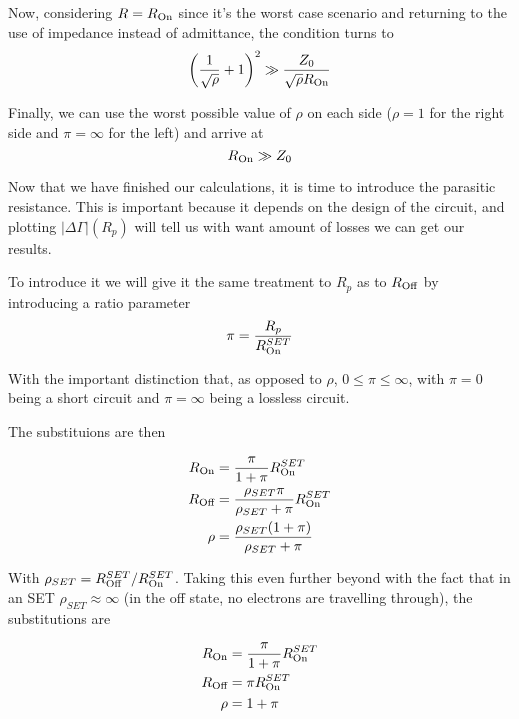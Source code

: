 \documentclass[../main.tex]{subfiles}
\begin{document}
Now, considering \(R = R_{\text{On}}\) since it's the worst case scenario and
returning to the use of impedance instead of admittance, the condition turns to
\begin{equation*}
\label{eq:ProtoOptParallelContrApprox}
    \left(\frac{1}{\sqrt\rho} + 1\right)^2 \gg
    \frac{Z_{0}}{\sqrt\rho R_{\text{On}}}
\end{equation*}

Finally, we can use the worst possible value of \(\rho\) on each side
(\(\rho = 1\) for the right side and \(\pi = \infty\) for the left) and
arrive at
\begin{equation}
\label{eq:OptParallelContrApprox}
    R_{\text{On}} \gg Z_{0}
\end{equation}

Now that we have finished our calculations, it is time to introduce the
parasitic resistance. This is important because it depends on the design of
the circuit, and plotting \(|\Delta\Gamma|(R_{p})\) will tell us with want
amount of losses we can get our results.

To introduce it we will give it the same treatment to \(R_{p}\) as to
\(R_{\text{Off}}\) by introducing a ratio parameter
\begin{equation*}
\label{eq:PiDef}
    \pi = \frac{R_{p}}{R_{\text{On}}^{SET}}
\end{equation*}

With the important distinction that, as opposed to \(\rho\), \(0\leq\pi\leq\infty\),
with \(\pi = 0\) being a short circuit and \(\pi = \infty\)
being a lossless circuit.

The substituions are then

\begin{align*}
    R_{\text{On}}
    &= \frac{\pi}{1 + \pi} R_{\text{On}}^{SET}\\
    R_{\text{Off}}
    &= \frac{\rho_{SET}\pi}{\rho_{SET} + \pi}R_{\text{On}}^{SET}\\
    \rho
    &= \frac{\rho_{SET}(1 + \pi)}{\rho_{SET} + \pi}
\end{align*}

With \(\rho_{SET} = R_{\text{Off}}^{SET}/R_{\text{On}}^{SET}\). Taking this even further beyond
with the fact that in an SET \(\rho_{SET} \approx \infty\)
(in the off state, no electrons are travelling through), the substitutions are

\begin{align*}
    R_{\text{On}}
    &= \frac{\pi}{1 + \pi} R_{\text{On}}^{SET}\\
    R_{\text{Off}}
    &= \pi R_{\text{On}}^{SET}\\
    \rho
    &= 1 + \pi
\end{align*}
\end{document}
